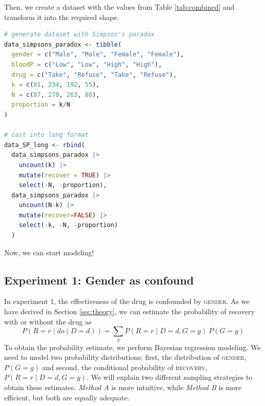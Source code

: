 \documentclass[nobib]{tufte-handout}
\newcommand{\mathdo}{\mathit{do}}
\begin{document}
\vspace{-0.5cm}
Then, we create a dataset with the values from Table \ref{tab:combined} and transform it into the required shape.

\begin{minipage}[]{\textwidth}
\begin{lstlisting}[language=R]
# generate dataset with Simpson's paradox
data_simpsons_paradox <- tibble(
  gender = c("Male", "Male", "Female", "Female"),
  bloodP = c("Low", "Low", "High", "High"),
  drug = c("Take", "Refuse", "Take", "Refuse"),
  k = c(81, 234, 192, 55),
  N = c(87, 270, 263, 80),
  proportion = k/N
)

# cast into long format
data_SP_long <- rbind(
  data_simpsons_paradox |> 
    uncount(k) |>
    mutate(recover = TRUE) |>
    select(-N, -proportion), 
  data_simpsons_paradox |>
    uncount(N-k) |>
    mutate(recover=FALSE) |>
    select(-k, -N, -proportion)
  )

\end{lstlisting}
\end{minipage}

\vspace{-0.5cm}
Now, we can start modeling!

\subsection{Experiment 1: Gender as confound}

In experiment 1, the effectiveness of the drug is confounded by \textsc{gender}.
As we have derived in Section \ref{sec:theory}, we can estimate the probability of recovery with or without the drug as 
$$P \left(R=r \mid \mathdo (D=d)\right) = \sum_{g} P\left(R = r \mid D=d, G=g \right) \ P\left( G=g \right)$$
To obtain the probability estimate, we perform Bayesian regression modeling.
We need to model two probability distributions: first, the distribution of \textsc{gender}, $P\left( G=g \right)$ and second, the conditional probability of \textsc{recovery}, $P\left(R = r \mid D=d, G=g \right)$.
We will explain two different sampling strategies to obtain these estimates.
\emph{Method A} is more intuitive, while \emph{Method B} is more efficient, but both are equally adequate.
\end{document}
